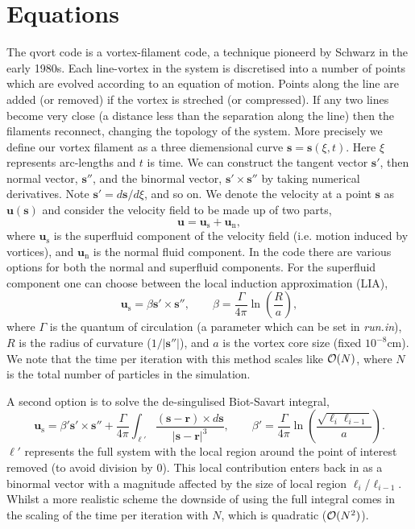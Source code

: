 \documentclass[12pt]{article}
\newcommand{\bs}{\mathbf{s}}
\newcommand{\br}{\mathbf{r}}
\newcommand{\bu}{\mathbf{u}}
\begin{document}
\section{Equations}\label{Sec:eqn}
  The {\sc qvort} code is a vortex-filament code, a technique pioneerd by Schwarz in the early 1980s. 
  Each line-vortex in the system is discretised into a number of points which are evolved according to an equation of motion.
  Points along the line are added (or removed) if the vortex is streched (or compressed).
  If any two lines become very close (a distance less than the separation along the line) then the filaments reconnect, changing the topology of the system.  
  More precisely we define our vortex filament as a three diemensional curve $\bs=\bs(\xi,t)$.
  Here $\xi$ represents arc-lengths and $t$ is time.
  We can construct the tangent vector $\bs'$, then normal vector, $\bs''$,
  and the binormal vector, $\bs' \times \bs''$ by taking numerical derivatives.
  Note $\bs'=d \bs/d\xi$, and so on.
  We denote the velocity at a point $\bs$ as $\bu(\bs)$ and consider the velocity field to be made up of two parts,
  \begin{equation} 
     \bu=\bu_\mathrm{s}+\bu_\mathrm{n},
  \end{equation} 
  where $\bu_\mathrm{s}$ is the superfluid component of the velocity field (i.e. motion induced by vortices),
  and $\bu_\mathrm{n}$ is the normal fluid component.
  In the code there are various options for both the normal and superfluid components.
  For the superfluid component one can choose between the local induction approximation (LIA),
  \begin{equation}\label{Eq:LIA}
    \bu_\mathrm{s}=\beta \bs' \times \bs'', \qquad \beta=\frac{\Gamma}{4\pi} \ln \left( \frac{R}{a} \right),
  \end{equation} 
  where $\Gamma$ is the quantum of circulation (a parameter which can be set in {\it run.in}), 
  $R$ is the radius of curvature ($1/|\bs''|$), and $a$ is the vortex core size (fixed $10^{-8}$cm).
  We note that the time per iteration with this method scales like ${\cal O}(N)$, where $N$ is the total
  number of particles in the simulation.

  A second option is to solve the de-singulised Biot-Savart integral,
  \begin{equation}\label{Eq:BS}
    \bu_\mathrm{s}=\beta' \bs' \times \bs''+ \frac{\Gamma}{4\pi} \int_{\ell'} \frac{(\bs-\br)\times d\bs}{|\bs-\br|^3},
    \qquad \beta'=\frac{\Gamma}{4\pi} \ln \left( \frac{\sqrt{\ell_{i}\ell_{i-1}}}{a}\right).
  \end{equation}
  $\ell'$ represents the full system with the local region around the point of interest removed (to avoid division by 0).
  This local contribution enters back in as a binormal vector with a magnitude affected by the size of local region $\ell_i$/$\ell_{i-1}$.
  Whilst a more realistic scheme the downside of using the full integral comes in the scaling of the time per iteration with $N$, which is quadratic (${\cal O}(N^2)$).
      
\end{document}

